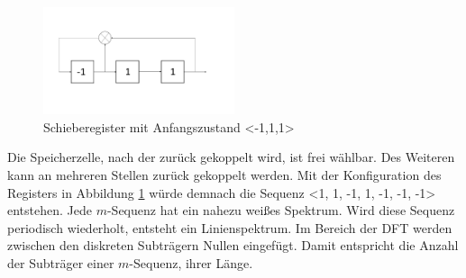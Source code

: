 \begin{figure}[htbp]
	\centering
	\includegraphics[width = 0.5\textwidth]{images/Schieberegister}
	\caption{Schieberegister mit Anfangszustand <-1,1,1>}
	\label{fig:Schieberegister}

\end{figure} 

Die Speicherzelle, nach der zurück gekoppelt wird, ist frei wählbar. Des Weiteren kann an mehreren Stellen zurück gekoppelt werden. Mit der Konfiguration des Registers in Abbildung \ref{fig:Schieberegister} würde demnach die Sequenz <1, 1, -1, 1, -1, -1, -1> entstehen. 
Jede $m$-Sequenz hat ein nahezu weißes Spektrum. Wird diese Sequenz periodisch wiederholt, entsteht ein Linienspektrum. Im Bereich der \gls{DFT} werden zwischen den diskreten Subträgern Nullen eingefügt. Damit entspricht die Anzahl der Subträger einer $m$-Sequenz, ihrer Länge.
